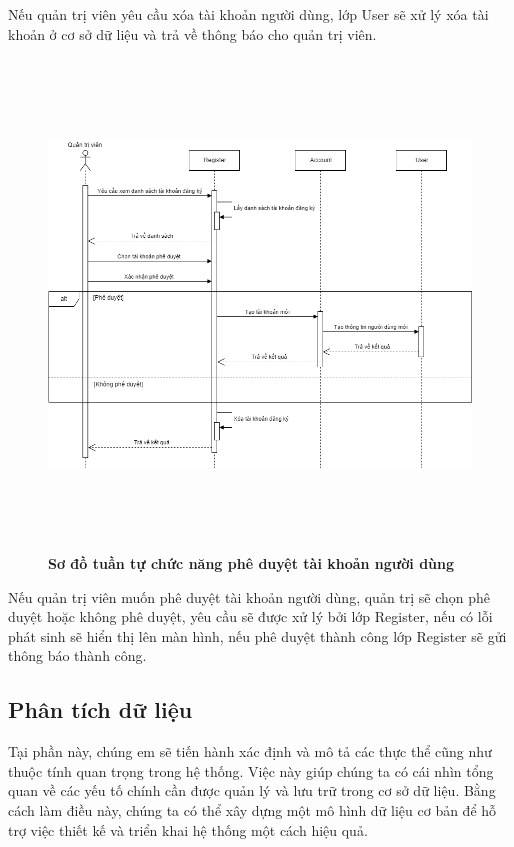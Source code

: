 Nếu quản trị viên yêu cầu xóa tài khoản người dùng, lớp User sẽ xử lý xóa tài khoản ở cơ sở dữ liệu và trả về thông báo cho quản trị viên.
\begin{figure}[H]
  \centering
  \includegraphics[width=14.5cm,height=13cm]{Images/sequence/sequence_manage_register.png}
  \caption[Sơ đồ tuần tự chức năng phê duyệt tài khoản người dùng]{\bfseries \fontsize{12pt}{0pt}
  \selectfont Sơ đồ tuần tự chức năng phê duyệt tài khoản người dùng}
  \label{sequence_manage_register} %
\end{figure}
Nếu quản trị viên muốn phê duyệt tài khoản người dùng, quản trị sẽ chọn phê duyệt hoặc không phê duyệt, yêu cầu sẽ được xử lý bởi lớp Register, nếu có lỗi phát sinh sẽ hiển thị lên màn hình,
nếu phê duyệt thành công lớp Register sẽ gửi thông báo thành công. 

\subsection{Phân tích dữ liệu}

Tại phần này, chúng em sẽ tiến hành xác định và mô tả các thực thể cũng như
 thuộc tính quan trọng trong hệ thống. Việc này giúp chúng ta có cái
  nhìn tổng quan về các yếu tố chính cần được quản lý và lưu trữ
   trong cơ sở dữ liệu. Bằng cách làm điều này, chúng ta có thể
    xây dựng một mô hình dữ liệu cơ bản để hỗ trợ việc thiết kế và
     triển khai hệ thống một cách hiệu quả.

